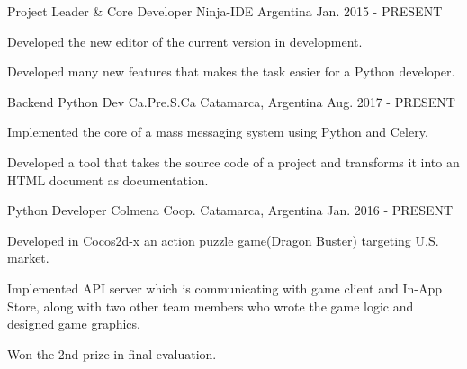 

\begin{cventries}

  \cventry
    {Project Leader \& Core Developer} %
    {Ninja-IDE} %
    {Argentina} %
    {Jan. 2015 - PRESENT} %
    {
      \begin{cvitems} %
        \item {Developed the new editor of the current version in development.}
        \item {Developed many new features that makes the task easier for a Python developer.}
      \end{cvitems}
    }

  \cventry
    {Backend Python Dev} %
    {Ca.Pre.S.Ca} %
    {Catamarca, Argentina} %
    {Aug. 2017 - PRESENT} %
    {
      \begin{cvitems} %
        \item {Implemented the core of a mass messaging system using Python and Celery.}
        \item {Developed a tool that takes the source code of a project and transforms it into an HTML document as documentation.}
      \end{cvitems}
    }

  \cventry
    {Python Developer} %
    {Colmena Coop.} %
    {Catamarca, Argentina} %
    {Jan. 2016 - PRESENT} %
    {
      \begin{cvitems} %
        \item {Developed in Cocos2d-x an action puzzle game(Dragon Buster) targeting U.S. market.}
        \item {Implemented API server which is communicating with game client and In-App Store, along with two other team members who wrote the game logic and designed game graphics.}
        \item {Won the 2nd prize in final evaluation.}
      \end{cvitems}
    }

\end{cventries}
